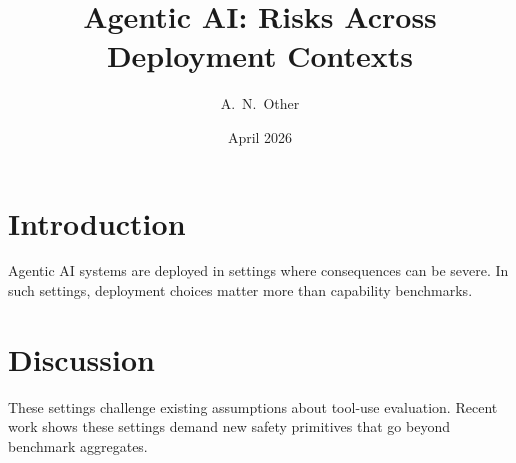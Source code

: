 \documentclass[11pt]{article}
\title{Agentic AI: Risks Across Deployment Contexts}
\author{A.\ N.\ Other}
\date{April 2026}
\begin{document}
\maketitle

\section{Introduction}

Agentic AI systems are deployed in settings where consequences can be severe.
In such settings, deployment choices matter more than capability benchmarks.

\section{Discussion}

These settings challenge existing assumptions about tool-use evaluation.
Recent work shows these settings demand new safety primitives that go beyond benchmark aggregates.
\end{document}

